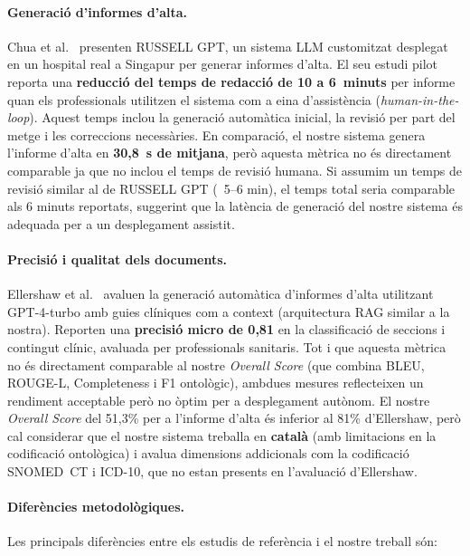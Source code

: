 \documentclass[CAT]{TFUOC}%
\begin{document}
\paragraph{Generació d'informes d'alta.}
Chua et al.~\cite{chua2024discharge} presenten RUSSELL GPT, un sistema LLM customitzat desplegat en un hospital real a Singapur per generar informes d'alta. El seu estudi pilot reporta una \textbf{reducció del temps de redacció de 10 a 6~minuts} per informe quan els professionals utilitzen el sistema com a eina d'assistència (\textit{human-in-the-loop}). Aquest temps inclou la generació automàtica inicial, la revisió per part del metge i les correccions necessàries. En comparació, el nostre sistema genera l'informe d'alta en \textbf{30,8~s de mitjana}, però aquesta mètrica no és directament comparable ja que no inclou el temps de revisió humana. Si assumim un temps de revisió similar al de RUSSELL GPT (~5--6 min), el temps total seria comparable als 6 minuts reportats, suggerint que la latència de generació del nostre sistema és adequada per a un desplegament assistit.

\paragraph{Precisió i qualitat dels documents.}
Ellershaw et al.~\cite{ellershaw2024discharge} avaluen la generació automàtica d'informes d'alta utilitzant GPT-4-turbo amb guies clíniques com a context (arquitectura RAG similar a la nostra). Reporten una \textbf{precisió micro de 0,81} en la classificació de seccions i contingut clínic, avaluada per professionals sanitaris. Tot i que aquesta mètrica no és directament comparable al nostre \textit{Overall Score} (que combina BLEU, ROUGE-L, Completeness i F1 ontològic), ambdues mesures reflecteixen un rendiment acceptable però no òptim per a desplegament autònom. El nostre \textit{Overall Score} del 51,3\% per a l'informe d'alta és inferior al 81\% d'Ellershaw, però cal considerar que el nostre sistema treballa en \textbf{català} (amb limitacions en la codificació ontològica) i avalua dimensions addicionals com la codificació SNOMED~CT i ICD-10, que no estan presents en l'avaluació d'Ellershaw.

\paragraph{Diferències metodològiques.}
Les principals diferències entre els estudis de referència i el nostre treball són:
\end{document}
